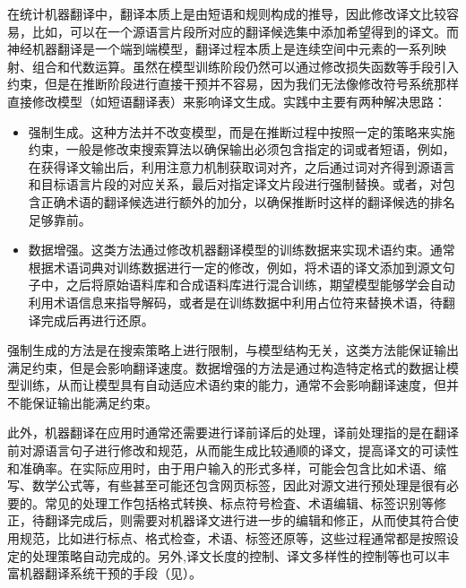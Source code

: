 \parinterval 在统计机器翻译中，翻译本质上是由短语和规则构成的推导，因此修改译文比较容易，比如，可以在一个源语言片段所对应的翻译候选集中添加希望得到的译文。而神经机器翻译是一个端到端模型，翻译过程本质上是连续空间中元素的一系列映射、组合和代数运算。虽然在模型训练阶段仍然可以通过修改损失函数等手段引入约束，但是在推断阶段进行直接干预并不容易，因为我们无法像修改符号系统那样直接修改模型（如短语翻译表）来影响译文生成。实践中主要有两种解决思路：

\begin{itemize}
\vspace{0.5em}
\item 强制生成。这种方法并不改变模型，而是在推断过程中按照一定的策略来实施约束，一般是修改束搜索算法以确保输出必须包含指定的词或者短语，例如，在获得译文输出后，利用注意力机制获取词对齐，之后通过词对齐得到源语言和目标语言片段的对应关系，最后对指定译文片段进行强制替换。或者，对包含正确术语的翻译候选进行额外的加分，以确保推断时这样的翻译候选的排名足够靠前。

\vspace{0.5em}
\item 数据增强。这类方法通过修改机器翻译模型的训练数据来实现术语约束。通常根据术语词典对训练数据进行一定的修改，例如，将术语的译文添加到源文句子中，之后将原始语料库和合成语料库进行混合训练，期望模型能够学会自动利用术语信息来指导解码，或者是在训练数据中利用占位符来替换术语，待翻译完成后再进行还原。

\vspace{0.5em}
\end{itemize}

\parinterval 强制生成的方法是在搜索策略上进行限制，与模型结构无关，这类方法能保证输出满足约束，但是会影响翻译速度。数据增强的方法是通过构造特定格式的数据让模型训练，从而让模型具有自动适应术语约束的能力，通常不会影响翻译速度，但并不能保证输出能满足约束。

\parinterval 此外，机器翻译在应用时通常还需要进行译前译后的处理，译前处理指的是在翻译前对源语言句子进行修改和规范，从而能生成比较通顺的译文，提高译文的可读性和准确率。在实际应用时，由于用户输入的形式多样，可能会包含比如术语、缩写、数学公式等，有些甚至可能还包含网页标签，因此对源文进行预处理是很有必要的。常见的处理工作包括格式转换、标点符号检査、术语编辑、标签识别等修正，待翻译完成后，则需要对机器译文进行进一步的编辑和修正，从而使其符合使用规范，比如进行标点、格式检查，术语、标签还原等，这些过程通常都是按照设定的处理策略自动完成的。另外,译文长度的控制、译文多样性的控制等也可以丰富机器翻译系统干预的手段（见{\chapterfourteen}）。

